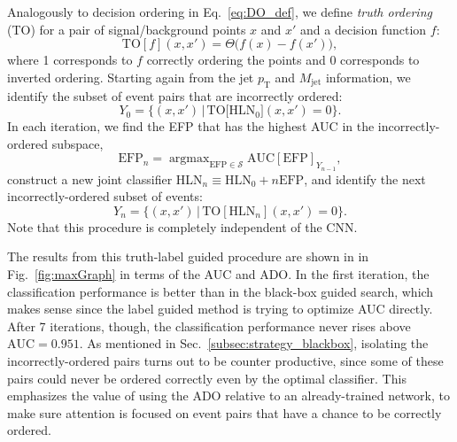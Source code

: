 \documentclass[aps,prd,twocolumn,superscriptaddress,preprintnumbers,nofootinbib,longbibliography,floatfix]{revtex4-1}
\newcommand{\PTM}{\text{HLN}_0}
\newcommand{\TO}{\text{TO}}
\newcommand{\AUC}{\text{AUC}}
\newcommand{\EFP}{\text{EFP}}
\DeclareMathOperator*{\argmax}{argmax}
\newcommand{\Fig}[1]{Fig.~\ref{#1}}
\newcommand{\Sec}[1]{Sec.~\ref{#1}}
\newcommand{\Eq}[1]{Eq.~\eqref{#1}}
\begin{document}
Analogously to decision ordering in \Eq{eq:DO_def}, we define \emph{truth ordering} (TO) for a pair of signal/background points $x$ and $x'$ and a decision function $f$:
\begin{equation}
	\TO[f](x,x') = \Theta \big( f(x) - f(x') \big),
\end{equation}
where 1 corresponds to $f$ correctly ordering the points and 0 corresponds to inverted ordering. Starting again from the jet $p_{\textrm{T}}$ and $M_{\textrm{jet}}$ information, we identify the subset of event pairs that are incorrectly ordered: 
\begin{equation}
	Y_0 = \Big\{ (x,x') \, \Big| \, \TO\big[\PTM \big](x,x') = 0 \Big\}.
\end{equation}
In each iteration, we find the EFP that has the highest AUC in the incorrectly-ordered subspace,
\begin{equation}
	\EFP_n = \argmax_{\EFP \in \mathcal{S}} \AUC[\EFP]_{Y_{n-1}},
\end{equation}
construct a new joint classifier HLN$_n \equiv \PTM + n\EFP$, and identify the next incorrectly-ordered subset of events:
\begin{equation}
	Y_n = \Big\{ (x,x') \, \Big| \, \TO[\text{HLN}_n](x,x') = 0 \Big\}.
\end{equation}
Note that this procedure is completely independent of the CNN.

The results from this truth-label guided procedure are shown in in \Fig{fig:maxGraph} in terms of the AUC and ADO. In the first iteration, the classification performance is better than in the black-box guided search, which makes sense since the label guided method is trying to optimize AUC directly. After 7 iterations, though, the classification performance never rises above $\AUC = 0.951$. As mentioned in \Sec{subsec:strategy_blackbox}, isolating the incorrectly-ordered pairs turns out to be counter productive, since some of these pairs could never be ordered correctly even by the optimal classifier. This emphasizes the value of using the ADO relative to an already-trained network, to make sure attention is focused on event pairs that have a chance to be correctly ordered.
\end{document}
